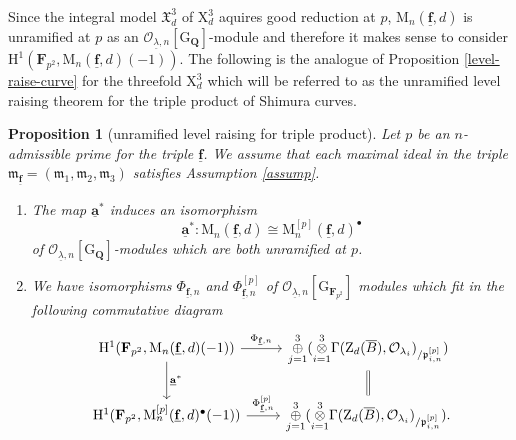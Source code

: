 \documentclass[10pt]{amsart}
\numberwithin{equation}{section}
\theoremstyle{plain}
\newtheorem{proposition}[theorem]{Proposition}
\numberwithin{equation}{section}
\theoremstyle{definition}
\theoremstyle{remark}
\def\frakm{\mathfrak{m}}
\def\interX{\mathfrak{X}}
\def\undlamb{\underline{\lambda}}
\def\triplef{\underline{\mathbf{f}}}
\def\threetensor{\overset{3}{\underset{i=1}\otimes}}
\def\threesum{\overset{3}{\underset{j=1}\oplus} }
\def\calO{\mathcal{O}}
\def\frakm{\mathfrak{m}}
\def\frakp{\mathfrak{p}}
\def\FF{\mathbf{F}}
\def\QQ{\mathbf{Q}}
\def\rmG{\mathrm{G}}
\def\rmH{\mathrm{H}}
\def\rmM{\mathrm{M}}
\def\rmX{\mathrm{X}}
\def\rmZ{\mathrm{Z}}
\begin{document}
Since the integral model $\interX^{3}_{d}$ of $\rmX^{3}_{d}$ aquires good reduction at $p$, $\rmM_{n}(\triplef, d)$ is unramified at $p$ as an $\calO_{\undlamb, n}[\rmG_{\QQ}]$-module and therefore it makes sense to consider $\rmH^{1}(\FF_{p^{2}}, \rmM_{n}(\triplef, d)(-1))$. The following is the analogue of Proposition \ref{level-raise-curve} for the threefold $\rmX^{3}_{d}$ which will be referred to as the unramified level raising theorem for the triple product of Shimura curves.
\begin{proposition}[unramified level raising for triple product]\label{level-raising-decomp}
Let $p$ be an \emph{$n$-admissible} prime for the triple $\triplef$. We assume that each maximal ideal in the triple $\frakm_{\triplef}=(\frakm_{1}, \frakm_{2}, \frakm_{3})$ satisfies Assumption \ref{assump}. 
\begin{enumerate}
\item The map $\underline{\mathbf{a}}^{\ast}$ induces an isomorphism
\begin{equation*}
\underline{\mathbf{a}}^{\ast}: \rmM_{n}(\triplef, d)\cong \rmM^{[p]}_{n}(\triplef, d)^{\bullet}
\end{equation*}
of $\calO_{\undlamb, n}[\rmG_{\QQ}]$-modules which are both unramified at $p$.

\item We have isomorphisms $\Phi_{\triplef, n}$ and $\Phi^{[p]}_{\triplef, n}$ of $\calO_{\undlamb, n}[\rmG_{\FF_{p^{2}}}]$ modules which fit in the following commutative diagram
\begin{equation*}
\begin{tikzcd}
\rmH^{1}(\FF_{p^{2}}, \rmM_{n}(\triplef, d)(-1)) \arrow[r, "\Phi_{\triplef, n}"] \arrow[d, "\underline{\mathbf{a}}^{\ast}"] & \threesum(\threetensor\Gamma(\rmZ_{d}(\overline{B}),\calO_{\lambda_{i}})_{/\frakp^{[p]}_{i,n}})\arrow[d, Rightarrow, no head] \\
\rmH^{1}(\FF_{p^{2}}, \rmM^{[p]}_{n}(\triplef, d)^{\bullet}(-1))\arrow[r, "\Phi^{[p]}_{\triplef, n}"] & \threesum(\threetensor\Gamma(\rmZ_{d}(\overline{B}),\calO_{\lambda_{i}})_{/\frakp^{[p]}_{i,n}} ).                      
\end{tikzcd}
\end{equation*}
\end{enumerate}
\end{proposition}
\end{document}
